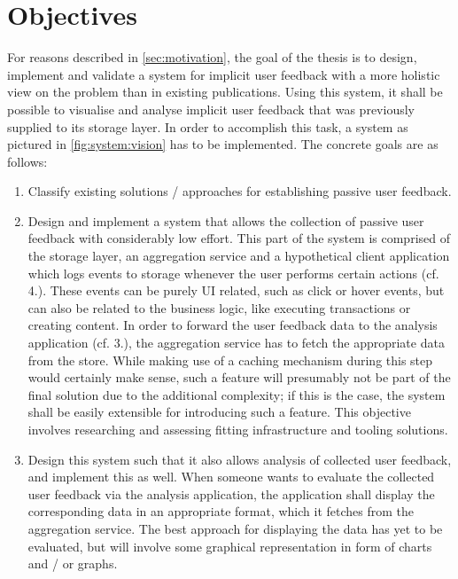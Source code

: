 %
\chapter{Objectives}
\label{sec:objectives}

For reasons described in \cref{sec:motivation}, the goal of the thesis is to design, implement and validate a system for implicit user feedback with a more holistic view on the problem than in existing publications.
Using this system, it shall be possible to visualise and analyse implicit user feedback that was previously supplied to its storage layer.
In order to accomplish this task, a system as pictured in \cref{fig:system:vision} has to be implemented.
The concrete goals are as follows:

\begin{enumerate}
\item Classify existing solutions / approaches for establishing passive user feedback.
\item Design and implement a system that allows the collection of passive user feedback with considerably low effort.
This part of the system is comprised of the storage layer, an aggregation service and a hypothetical client application which logs events to storage whenever the user performs certain actions (cf. 4.).
These events can be purely UI related, such as click or hover events, but can also be related to the business logic, like executing transactions or creating content.
In order to forward the user feedback data to the analysis application (cf. 3.), the aggregation service has to fetch the appropriate data from the store.
While making use of a caching mechanism during this step would certainly make sense, such a feature will presumably not be part of the final solution due to the additional complexity; if this is the case, the system shall be easily extensible for introducing such a feature.
This objective involves researching and assessing fitting infrastructure and tooling solutions.
\item Design this system such that it also allows analysis of collected user feedback, and implement this as well.
When someone wants to evaluate the collected user feedback via the analysis application, the application shall display the corresponding data in an appropriate format, which it fetches from the aggregation service.
The best approach for displaying the data has yet to be evaluated, but will involve some graphical representation in form of charts and / or graphs.

\end{enumerate}
